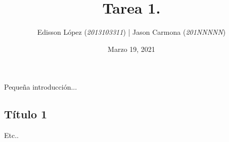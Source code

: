 \documentclass[12pt]{article}
\title{Tarea 1.}
\author{Edisson López (\textit{2013103311}) | Jason Carmona  (\textit{201NNNNN})}
\date{Marzo 19, 2021}
\begin{document}
\maketitle


Pequeña introducción... 

\subsection*{Título 1}
Etc..
\end{document}
